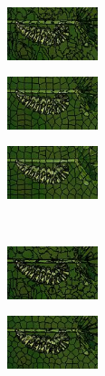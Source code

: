 \begin{figure}
	\begin{subfigure}[b]{0.02\textwidth}
	\end{subfigure}
	\begin{subfigure}[b]{0.141\textwidth}
		\includegraphics[height=1.525cm]{pictures/compactness/bsds500/lsc/score/0/cropped/lsc_35028_contours}
	\end{subfigure}
	\begin{subfigure}[b]{0.141\textwidth}
		\includegraphics[height=1.525cm]{pictures/compactness/bsds500/lsc/score/0.1/cropped/lsc_35028_contours}
	\end{subfigure}
	\begin{subfigure}[b]{0.141\textwidth}
		\includegraphics[height=1.525cm]{pictures/compactness/bsds500/lsc/score/0.25/cropped/lsc_35028_contours}
	\end{subfigure}\\
	\begin{subfigure}[b]{0.02\textwidth}
	\end{subfigure}
	\begin{subfigure}[b]{0.141\textwidth}
		\includegraphics[height=1.525cm]{pictures/compactness/bsds500/etps/score/0.01/cropped/etps_35028_contours}
	\end{subfigure}
	\begin{subfigure}[b]{0.141\textwidth}
		\includegraphics[height=1.525cm]{pictures/compactness/bsds500/etps/score/0.1/cropped/etps_35028_contours}

\end{subfigure}
\end{figure}
